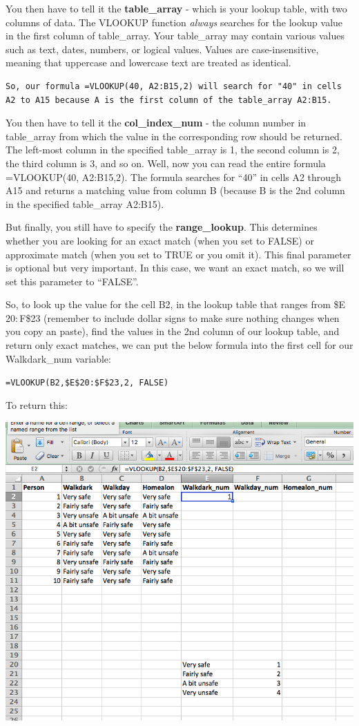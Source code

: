 \documentclass[]{book}
\theoremstyle{definition}
\theoremstyle{definition}
\theoremstyle{definition}
\theoremstyle{remark}
\begin{document}
You then have to tell it the \textbf{table\_array} - which is your
lookup table, with two columns of data. The VLOOKUP function
\emph{always} searches for the lookup value in the first column of
table\_array. Your table\_array may contain various values such as text,
dates, numbers, or logical values. Values are case-insensitive, meaning
that uppercase and lowercase text are treated as identical.

\begin{verbatim}
So, our formula =VLOOKUP(40, A2:B15,2) will search for "40" in cells A2 to A15 because A is the first column of the table_array A2:B15. 
\end{verbatim}

You then have to tell it the \textbf{col\_index\_num} - the column
number in table\_array from which the value in the corresponding row
should be returned. The left-most column in the specified table\_array
is 1, the second column is 2, the third column is 3, and so on. Well,
now you can read the entire formula =VLOOKUP(40, A2:B15,2). The formula
searches for ``40'' in cells A2 through A15 and returns a matching value
from column B (because B is the 2nd column in the specified table\_array
A2:B15).

But finally, you still have to specify the \textbf{range\_lookup}. This
determines whether you are looking for an exact match (when you set to
FALSE) or approximate match (when you set to TRUE or you omit it). This
final parameter is optional but very important. In this case, we want an
exact match, so we will set this parameter to ``FALSE''.

So, to look up the value for the cell B2, in the lookup table that
ranges from \$E\(20:\)F\$23 (remember to include dollar signs to make
sure nothing changes when you copy an paste), find the values in the 2nd
column of our lookup table, and return only exact matches, we can put
the below formula into the first cell for our Walkdark\_num variable:

\texttt{=VLOOKUP(B2,\$E\$20:\$F\$23,2,\ FALSE)}

To return this:

\includegraphics{imgs/first_lookup.png}
\end{document}
